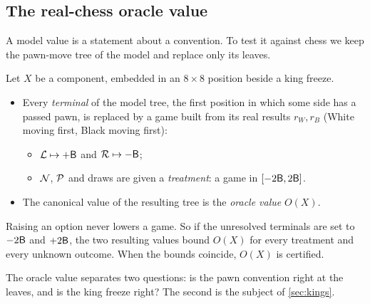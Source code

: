 \subsection{The real-chess oracle value}
A model value is a statement about a convention. To test it against chess we keep the pawn-move tree of the
model and replace only its leaves.
\begin{definition}\label{def:oracle}
Let $X$ be a component, embedded in an $8\times8$ position beside a king freeze.
\begin{itemize}
\item Every \emph{terminal} of the model tree, the first position in which some side has a passed pawn, is
  replaced by a game built from its real results $r_W, r_B$ (White moving first, Black moving first):
  \begin{itemize}
  \item $\mathcal{L}\mapsto+\mathsf{B}$ and $\mathcal{R}\mapsto-\mathsf{B}$;
  \item $\mathcal{N}$, $\mathcal{P}$ and draws are given a \emph{treatment}: a game in $[-2\mathsf{B},2\mathsf{B}]$.
  \end{itemize}
\item The canonical value of the resulting tree is the \emph{oracle value} $O(X)$.
\end{itemize}
\end{definition}
\begin{lemma}
Raising an option never lowers a game. So if the unresolved terminals are set to $-2\mathsf{B}$ and $+2\mathsf{B}$, the two
resulting values bound $O(X)$ for every treatment and every unknown outcome. When the bounds coincide, $O(X)$ is
certified.
\end{lemma}
The oracle value separates two questions: is the pawn convention right at the leaves, and is the king freeze
right? The second is the subject of \cref{sec:kings}.

